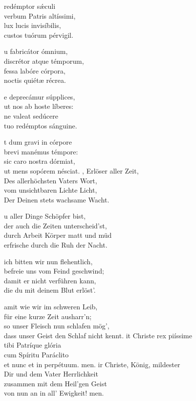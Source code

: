 \documentclass[fontsize=10pt,paper=A5,twoside,BCOR=1mm,DIV=21,headinclude]{scrarticle}
\begin{document}
\begin{paracol}{2}\pcb
\begin{hymnus}
 redémptor s\'æculi\\
\hspace{1.6em} verbum Patris altíssimi,\\
lux lucis invisíbilis,\\
custos tuórum pérvigil.

u fabricátor ómnium,\\
discrétor atque témporum,\\
fessa labóre córpora,\\
noctis quiétæ récrea.

e deprecámur súpplices,\\
ut nos ab hoste líberes:\\
ne valeat sedúcere\\
tuo redémptos sánguine.

t dum gravi in córpore\\
brevi manémus témpore:\\
sic caro nostra dórmiat,\\
ut mens sopórem nésciat.
	\switchcolumn
	, Erlöser aller Zeit,\\
	\hspace{1.6em} Des allerhöchsten Vaters Wort,\\
	vom unsichtbaren Lichte Licht,\\
	Der Deinen stets wachsame Wacht.

	u aller Dinge Schöpfer bist,\\
	der auch die Zeiten unterscheid'st,\\
	durch Arbeit Körper matt und müd\\
	erfrische durch die Ruh der Nacht.

	ich bitten wir nun flehentlich,\\
	befreie uns vom Feind geschwind;\\
	damit er nicht verführen kann,\\
	die du mit deinem Blut erlöst'.

	amit wie wir im schweren Leib,\\
	für eine kurze Zeit ausharr'n;\\
	so unser Fleisch nun schlafen mög',\\
	dass unser Geist den Schlaf nicht kennt.
\switchcolumn*
{}it Christe rex piíssime\\
tibi Patríque glória\\
cum Spíritu Paráclito\\
et nunc et in perpétuum. men.
	\switchcolumn
	ir Christe, König, mildester\\
	Dir und dem Vater Herrlichkeit\\
	zusammen mit dem Heil'gen Geist\\
	von nun an in all' Ewigkeit! men.
\end{hymnus}
\end{paracol}
\end{document}
